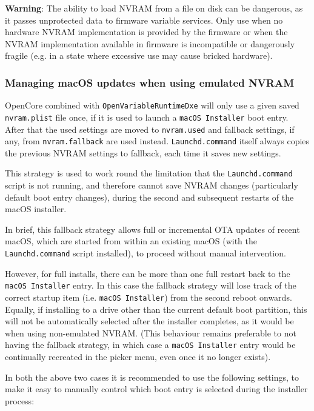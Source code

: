 \documentclass[]{article}
\begin{document}
\textbf{Warning}: The ability to load NVRAM from a file on disk can be dangerous, as it
passes unprotected data to firmware variable services. Only use when no hardware NVRAM
implementation is provided by the firmware or when the NVRAM implementation available in
firmware is incompatible or dangerously fragile (e.g. in a state where excessive use
may cause bricked hardware).

\subsubsection{Managing macOS updates when using emulated NVRAM}

OpenCore combined with \texttt{OpenVariableRuntimeDxe} will only use a given saved \texttt{nvram.plist} file once,
if it is used to launch a \texttt{macOS Installer} boot entry. After that the used settings are moved to \texttt{nvram.used}
and fallback settings, if any, from \texttt{nvram.fallback} are used instead. \texttt{Launchd.command} itself
always copies the previous NVRAM settings to fallback, each time it saves new settings.

This strategy is used to work round the limitation that the \texttt{Launchd.command} script is not running,
and therefore cannot save NVRAM changes (particularly default boot entry changes), during the second
and subsequent restarts of the macOS installer.

In brief, this fallback strategy allows full or incremental OTA updates of recent macOS, which are started from within
an existing macOS (with the \texttt{Launchd.command} script installed), to proceed without manual intervention.

However, for full installs, there can be more than one full restart back to the \texttt{macOS Installer} entry. In this case
the fallback strategy will lose track of the correct startup item (i.e. \texttt{macOS Installer}) from the second reboot
onwards. Equally, if installing to a drive other than the current default boot partition, this will not be automatically selected after
the installer completes, as it would be when using non-emulated NVRAM. (This behaviour remains preferable to not having the fallback strategy,
in which case a \texttt{macOS Installer} entry would be continually recreated in the picker menu, even once it no longer exists).

In both the above two cases it is recommended to use the following settings, to make it easy to manually control which boot
entry is selected during the installer process:
\end{document}

